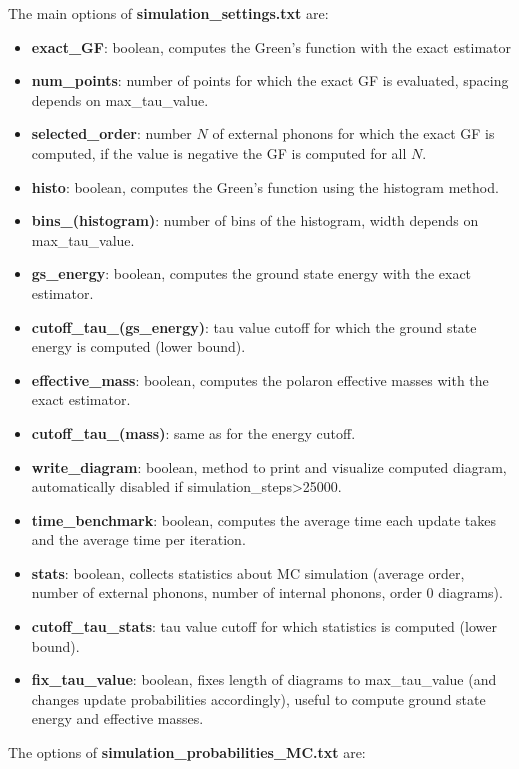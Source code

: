 The main options of \textbf{simulation\_settings.txt} are:
\begin{itemize}
    \item \textbf{exact\_GF}: boolean, computes the Green's function with the exact estimator
    \item \textbf{num\_points}: number of points for which the exact GF is evaluated, spacing depends on max\_tau\_value.
    \item \textbf{selected\_order}: number $N$ of external phonons for which the exact GF is computed, if the value is negative the GF is computed for all $N$. 
    \item \textbf{histo}: boolean, computes the Green's function using the histogram method.
    \item \textbf{bins\_(histogram)}: number of bins of the histogram, width depends on max\_tau\_value.
    \item \textbf{gs\_energy}: boolean, computes the ground state energy with the exact estimator.
    \item \textbf{cutoff\_tau\_(gs\_energy)}: tau value cutoff for which the ground state energy is computed (lower bound).
    \item \textbf{effective\_mass}: boolean, computes the polaron effective masses with the exact estimator.
    \item \textbf{cutoff\_tau\_(mass)}: same as for the energy cutoff.
    \item \textbf{write\_diagram}: boolean, method to print and visualize computed diagram, automatically disabled if simulation\_steps>25000.
    \item \textbf{time\_benchmark}: boolean, computes the average time each update takes and the average time per iteration.
    \item \textbf{stats}: boolean, collects statistics about MC simulation (average order, number of external phonons, number of internal phonons, order 0 diagrams).
    \item \textbf{cutoff\_tau\_stats}: tau value cutoff for which statistics is computed (lower bound).
    \item \textbf{fix\_tau\_value}: boolean, fixes length of diagrams to max\_tau\_value (and changes update probabilities accordingly), useful to compute ground state energy and effective masses.
    \end{itemize}
The options of \textbf{simulation\_probabilities\_MC.txt} are:
